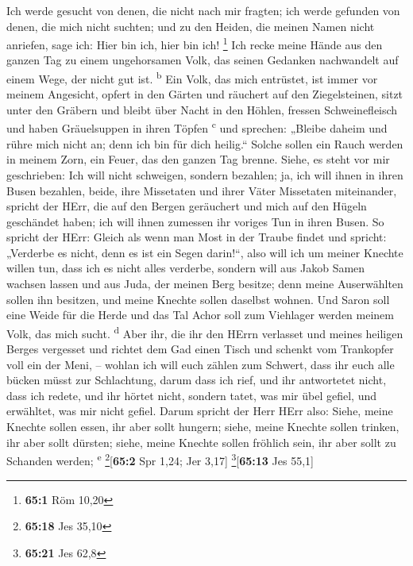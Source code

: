  Ich werde gesucht von denen, die nicht nach mir fragten;
ich werde gefunden von denen, die mich nicht suchten; und zu den Heiden,
die meinen Namen nicht anriefen, sage ich: Hier bin ich, hier bin ich!
\footnote{\textbf{65:1} Röm 10,20}  Ich recke meine Hände
aus den ganzen Tag zu einem ungehorsamen Volk, das seinen Gedanken
nachwandelt auf einem Wege, der nicht gut ist. \textsuperscript{b}
 Ein Volk, das mich entrüstet, ist immer vor meinem
Angesicht, opfert in den Gärten und räuchert auf den Ziegelsteinen,
 sitzt unter den Gräbern und bleibt über Nacht in den
Höhlen, fressen Schweinefleisch und haben Gräuelsuppen in ihren Töpfen
\textsuperscript{c}  und sprechen: „Bleibe daheim und
rühre mich nicht an; denn ich bin für dich heilig.`` Solche sollen ein
Rauch werden in meinem Zorn, ein Feuer, das den ganzen Tag brenne.
 Siehe, es steht vor mir geschrieben: Ich will nicht
schweigen, sondern bezahlen; ja, ich will ihnen in ihren Busen bezahlen,
 beide, ihre Missetaten und ihrer Väter Missetaten
miteinander, spricht der HErr, die auf den Bergen geräuchert und mich
auf den Hügeln geschändet haben; ich will ihnen zumessen ihr voriges Tun
in ihren Busen.  So spricht der HErr: Gleich als wenn man
Most in der Traube findet und spricht: „Verderbe es nicht, denn es ist
ein Segen darin!{}``, also will ich um meiner Knechte willen tun, dass
ich es nicht alles verderbe,  sondern will aus Jakob Samen
wachsen lassen und aus Juda, der meinen Berg besitze; denn meine
Auserwählten sollen ihn besitzen, und meine Knechte sollen daselbst
wohnen.  Und Saron soll eine Weide für die Herde und das
Tal Achor soll zum Viehlager werden meinem Volk, das mich sucht.
\textsuperscript{d}  Aber ihr, die ihr den HErrn
verlasset und meines heiligen Berges vergesset und richtet dem Gad einen
Tisch und schenkt vom Trankopfer voll ein der Meni, -- 
wohlan ich will euch zählen zum Schwert, dass ihr euch alle bücken müsst
zur Schlachtung, darum dass ich rief, und ihr antwortetet nicht, dass
ich redete, und ihr hörtet nicht, sondern tatet, was mir übel gefiel,
und erwähltet, was mir nicht gefiel.  Darum spricht der
Herr HErr also: Siehe, meine Knechte sollen essen, ihr aber sollt
hungern; siehe, meine Knechte sollen trinken, ihr aber sollt dürsten;
siehe, meine Knechte sollen fröhlich sein, ihr aber sollt zu Schanden
werden; \textsuperscript{e} \footnote{\textbf{65:18} Jes 35,10}{[}\textbf{65:2}
Spr 1,24; Jer 3,17{]} \footnote{\textbf{65:21} Jes 62,8}{[}\textbf{65:13}
Jes 55,1{]}

